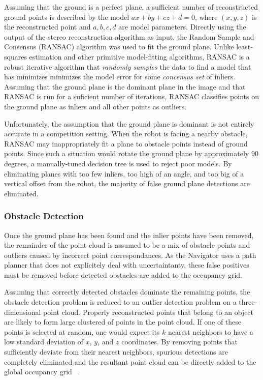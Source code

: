 \documentclass[twocolumn,11pt]{article}
\begin{document}
Assuming that the ground is a perfect plane, a sufficient number of
reconstructed ground points is described by the model $ax + by + cz + d =
0$, where $(x, y, z)$ is the reconstructed point and $a, b, c, d$ are model
parameters. Directly using the  output of the stereo reconstruction algorithm
as input, the Random Sample and Consensus (RANSAC) algorithm was used to fit
the ground plane. Unlike least-squares estimation and other primitive
model-fitting algorithms, RANSAC is a robust iterative algorithm that
\textit{randomly samples} the data to find a model that has minimizes minimizes
the model error for some \textit{concensus set} of inliers. Assuming that the
ground plane is the dominant plane in the image and that RANSAC is run for a
suficient number of iterations, RANSAC classifies points on the ground plane as
inliers and all other points as outliers.

Unfortunately, the assumption that the ground plane is dominant is not entirely
accurate in a competition setting. When the robot is facing a nearby obstacle,
RANSAC may inappropriately fit a plane to obstacle points instead of ground
points. Since such a situation would rotate the ground plane by approximately
90 degrees, a manually-tuned decision tree is used to reject poor models. By
eliminating planes with too few inliers, too high of an angle, and too big of
a vertical offset from the robot, the majority of false ground plane detections
are eliminated.

\subsubsection{Obstacle Detection}
\label{sec:stereo-od}
Once the ground plane has been found and the inlier points have been removed,
the remainder of the point cloud is assumed to be a mix of obstacle points
and outliers caused by incorrect point correspondances. As the Navigator uses
a path planner that does not explicitely deal with uncertaintanty, these false
positives must be removed before detected obstacles are added to the
occupancy grid. 

Assuming that correctly detected obstacles dominate the remaining points, the
obstacle detection problem is reduced to an outlier detection problem on a
three-dimensional point cloud. Properly reconstructed points that belong to an
object are likely to form large clustered of points in the point cloud. If one
of these points is selected at random, one would expect its $k$ nearest
neighbors to have a low standard deviation of $x$, $y$, and $z$ coordinates. By
removing points that sufficiently deviate from their nearest neighbors,
spurious detections are completely eliminated and the resultant point cloud can
be directly added to the global occupancy grid ~\cite{rusu2008towards}.
\end{document}
